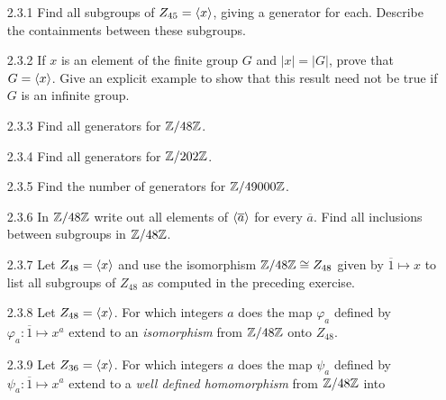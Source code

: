 \begin{enumerate}
   \item[2.3.1]   Find all subgroups of $Z_{45} = \langle x \rangle$, giving a generator
                  for each. Describe the containments between these subgroups.
   \item[2.3.2]   If $x$ is an element of the finite group $G$ and $|x| = |G|$,
                  prove that $G = \langle x \rangle$. Give an explicit example to show 
                  that this result need not be true if $G$ is an infinite group.
   \item[2.3.3]   Find all generators for $\mathbb{Z}/48\mathbb{Z}$.
   \item[2.3.4]   Find all generators for $\mathbb{Z}/202\mathbb{Z}$.
   \item[2.3.5]   Find the number of generators for $\mathbb{Z}/49000\mathbb{Z}$.
   \item[2.3.6]   In $\mathbb{Z}/48\mathbb{Z}$ write out all elements of $\langle \overline{a} \rangle$
                  for every $\overline{a}$. Find all inclusions between
                  subgroups in $\mathbb{Z}/48\mathbb{Z}$.
   \item[2.3.7]   Let $Z_{48} = \langle x \rangle$ and use the isomorphism
                  $\mathbb{Z}/48\mathbb{Z} \cong Z_{48}$ given by $\overline{1} \mapsto x$ to
                  list all subgroups of $Z_{48}$ as computed in the preceding
                  exercise.
   \item[2.3.8]   Let $Z_{48} = \langle x \rangle$. For which integers $a$ does the map
                  $\varphi_a$ defined by $\varphi_a : \overline{1} \mapsto x^a$
                  extend to an \textit{isomorphism} from $\mathbb{Z}/48\mathbb{Z}$ onto
                  $Z_{48}$.
   \item[2.3.9]   Let $Z_{36} = \langle x \rangle$. For which integers $a$ does the map
                  $\psi_a$ defined by $\psi_a : \overline{1} \mapsto x^a$ extend
                  to a \textit{well defined homomorphism} from $\mathbb{Z}/48\mathbb{Z}$ into

\end{enumerate}

